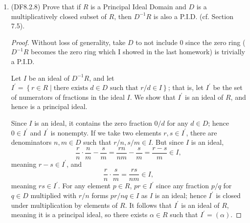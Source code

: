 \documentclass[11pt]{article}
\newcommand{\cbr}[1]{\left\{#1\right\}}
\begin{document}
\begin{enumerate}
\begin{enumerate}
\begin{proof}
            To collect results, we have that $I_a = (\alpha)$ and $J = (\beta)$ are principal ideals in $R$ with $I\subsetneq I_b\subseteq J$ and $I_aJ = (\alpha\beta)\subseteq I$.
        \end{proof}
        \item If $x\in I$ show that $x = s\alpha$ for some $s\in J$. Deduce that $I = I_aJ$ is principal, a contradiction, and conclude that $R$ is a P.I.D.
        \begin{proof}
            Let $x\in I\subseteq I_a = (\alpha)$. Then $x = s\alpha$ for some $s\in R$. Because $I$ is an ideal, we have for any $r\in R$ that $rx\in I$, and $rx = sr\alpha \in s(\alpha) = sI_a$. This implies that $sI_a \subseteq I$, which means $s\in J$. Hence $x = s\alpha$ with $s\in J$, meaning $x\in I_aJ$. But $x$ was an arbitrary element of $I$, meaning $I\subseteq I_aJ$ and by the previous part it follows that $I = I_aJ = (\alpha\beta)$, meaning $I$ is a principal ideal. This is in contradiction to our choice of $I$. It follows that there are no nonprincipal ideals in $R$ (i.e., $\mathcal{S}$ is empty).
        \end{proof}
    \end{enumerate}
    \item (DF8.2.8) Prove that if $R$ is a Principal Ideal Domain and $D$ is a multiplicatively closed subset of $R$, then $D^{-1}R$ is also a P.I.D. (cf. Section 7.5).
    \begin{proof}
        Without loss of generality, take $D$ to not include $0$ since the zero ring ($D^{-1}R$ becomes the zero ring which I showed in the last homework) is trivially a P.I.D.

        Let $I$ be an ideal of $D^{-1}R$, and let $I^{\prime} = \cbr{r\in R \mid \text{there exists $d\in D$ such that } r/d\in I}$; that is, let $I^{\prime}$ be the set of numerators of fractions in the ideal $I$. We show that $I^{\prime}$ is an ideal of $R$, and hence is a principal ideal.

        Since $I$ is an ideal, it contains the zero fraction $0/d$ for any $d\in D$; hence $0\in I^{\prime}$ and $I^{\prime}$ is nonempty. If we take two elements $r,s\in I^{\prime}$, there are denominators $n,m\in D$ such that $r/n,s/m\in I$. But since $I$ is an ideal, \[\frac{r}{n}\cdot \frac{n}{m} - \frac{s}{m} = \frac{rn}{nm} - \frac{s}{m} = \frac{r-s}{m}\in I,\] meaning $r-s\in I^{\prime}$, and \[\frac{r}{n}\cdot\frac{s}{m} = \frac{rs}{nm}\in I,\] meaning $rs\in I^{\prime}$. For any element $p\in R$, $pr\in I^{\prime}$ since any fraction $p/q$ for $q\in D$ multiplied with $r/n$ forms $pr/nq\in I$ as $I$ is an ideal; hence $I^{\prime}$ is closed under multiplication by elements of $R$. It follows that $I^{\prime}$ is an ideal of $R$, meaning it is a principal ideal, so there exists $\alpha\in R$ such that $I^{\prime} = (\alpha)$.


\end{proof}
\end{enumerate}
\end{document}
